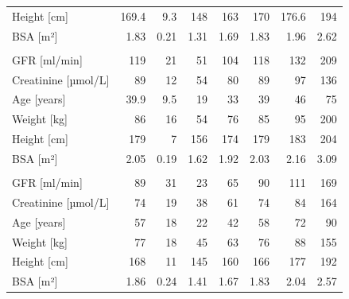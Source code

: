 \documentclass[11pt,]{article}
\begin{document}
\begin{longtable}[t]{lrrrrrrr}
\hspace{1em}Height [cm] & 169.4 & 9.3 & 148 & 163 & 170 & 176.6 & 194\\
\hspace{1em}BSA [m²] & 1.83 & 0.21 & 1.31 & 1.69 & 1.83 & 1.96 & 2.62\\
\addlinespace[0.6em]
\multicolumn{8}{l}{\textbf{Southampton}}\\
\hline
\hspace{1em}GFR [ml/min] & 119 & 21 & 51 & 104 & 118 & 132 & 209\\
\hspace{1em}Creatinine [µmol/L] & 89 & 12 & 54 & 80 & 89 & 97 & 136\\
\hspace{1em}Age [years] & 39.9 & 9.5 & 19 & 33 & 39 & 46 & 75\\
\hspace{1em}Weight [kg] & 86 & 16 & 54 & 76 & 85 & 95 & 200\\
\hspace{1em}Height [cm] & 179 & 7 & 156 & 174 & 179 & 183 & 204\\
\hspace{1em}BSA [m²] & 2.05 & 0.19 & 1.62 & 1.92 & 2.03 & 2.16 & 3.09\\
\addlinespace[0.6em]
\multicolumn{8}{l}{\textbf{Wales}}\\
\hline
\hspace{1em}GFR [ml/min] & 89 & 31 & 23 & 65 & 90 & 111 & 169\\
\hspace{1em}Creatinine [µmol/L] & 74 & 19 & 38 & 61 & 74 & 84 & 164\\
\hspace{1em}Age [years] & 57 & 18 & 22 & 42 & 58 & 72 & 90\\
\hspace{1em}Weight [kg] & 77 & 18 & 45 & 63 & 76 & 88 & 155\\
\hspace{1em}Height [cm] & 168 & 11 & 145 & 160 & 166 & 177 & 192\\
\hspace{1em}BSA [m²] & 1.86 & 0.24 & 1.41 & 1.67 & 1.83 & 2.04 & 2.57\\*
\end{longtable}
\end{document}

